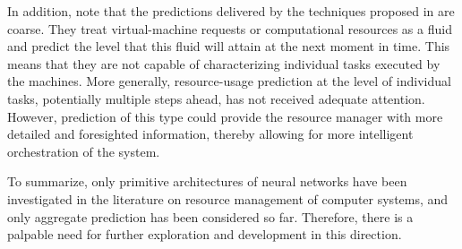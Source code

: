 In addition, note that the predictions delivered by the techniques proposed in
\cite{cao2014, dabbagh2015, ismaeel2015} are coarse. They treat virtual-machine
requests or computational resources as a fluid and predict the level that this
fluid will attain at the next moment in time. This means that they are not
capable of characterizing individual tasks executed by the machines. More
generally, resource-usage prediction at the level of individual tasks,
potentially multiple steps ahead, has not received adequate attention. However,
prediction of this type could provide the resource manager with more detailed
and foresighted information, thereby allowing for more intelligent orchestration
of the system.

To summarize, only primitive architectures of neural networks have been
investigated in the literature on resource management of computer systems, and
only aggregate prediction has been considered so far. Therefore, there is a
palpable need for further exploration and development in this direction.
